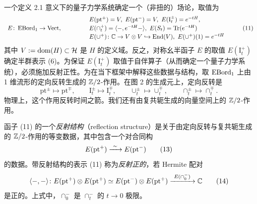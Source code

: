 一个定义 2.1 意义下的量子力学系统确定一个（非扭的）场论，取值为
\begin{equation}
\begin{array}{l}
E\colon\EBord_1\to\Vect,\qquad\qquad
\begin{array}{l}
E(\mathrm{pt}^{+})=V,\ E(\mathrm{pt}^{-})=\ol{V},\ E(\mathrm{I}^{\pm}_t)=e^{-tH},\\[2pt]
E(\cap^{+}_t)=\langle-,e^{-tH}-\rangle,\ E(S_t)=\Tr(e^{-tH})\\[2pt]
E(\cup^{+})\colon\C\to\ol{V}\otimes V\hookrightarrow\mathrm{End}(V),\ E(\cup^{+})(1)=e^{-tH}
\end{array}
\end{array}
\tag{11}
\end{equation}
其中 $V:=\mathrm{dom}(H)\subset\mathcal{H}$ 是 $H$ 的定义域。反之，对称幺半函子 $E$ 的取值 $E(\mathrm{I}^{+}_t)$ 确定半群表示 (6)。为保证 $E(\mathrm{I}^{+}_t)$ 取值于自伴算子（从而确定一个量子力学系统），必须施加反射正性。为在当下框架中解释这些数据与结构，取 $\operatorname{EBord}_1$ 上由 1 维流形的定向反转生成的 $\mathbb{Z}/2$-作用。在图 2 的生成元上，定向反转是
\begin{equation}
\mathrm{pt}^{\pm}\mapsto\mathrm{pt}^{\mp},\qquad
\mathrm{I}^{\pm}_t\mapsto\mathrm{I}^{\mp}_t,\qquad
\cup^{\pm}_t\mapsto\cup^{\mp}_t,\qquad
\cap^{\pm}_t\mapsto\cap^{\mp}_t.
\tag{12}
\end{equation}
物理上，这个作用反转时间之箭。我们还有由复共轭生成的向量空间上的 $\mathbb{Z}/2$-作用。

\begin{definition}[2.13（反射正性，略述）]
函子 (11) 的一个\emph{反射结构}（reflection structure）是关于由定向反转与复共轭生成的 $\mathbb{Z}/2$-作用的等变数据，其中包含一个对合同构
\begin{equation}
E(\mathrm{pt}^{+})\xrightarrow{\ \sim\ }\ol{E(\mathrm{pt}^{-})}
\tag{13}
\end{equation}
的数据。带反射结构的表示 (11) 称为\emph{反射正的}，若 Hermite 配对
\begin{equation}
\langle-,-\rangle\colon E(\mathrm{pt}^{+})\otimes E(\mathrm{pt}^{+})\simeq E(\mathrm{pt}^{-})\otimes E(\mathrm{pt}^{+})\xrightarrow{\ E(\cap^{-}_0)\ }\mathbb{C}
\tag{14}
\end{equation}
是正的。上式中，$\cap^{-}_0$ 是 $\cap^{-}_t$ 的 $t\to 0$ 极限。
\end{definition}


